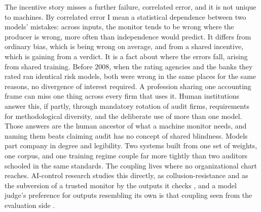 \documentclass[11pt]{article}
\begin{document}
The incentive story misses a further failure, correlated error, and it is not unique to machines. By correlated error I mean a statistical dependence between two models' mistakes: across inputs, the monitor tends to be wrong where the producer is wrong, more often than independence would predict. It differs from ordinary bias, which is being wrong on average, and from a shared incentive, which is gaining from a verdict. It is a fact about where the errors fall, arising from shared training. Before 2008, when the rating agencies and the banks they rated ran identical risk models, both were wrong in the same places for the same reasons, no divergence of interest required. A profession sharing one accounting frame can miss one thing across every firm that uses it. Human institutions answer this, if partly, through mandatory rotation of audit firms, requirements for methodological diversity, and the deliberate use of more than one model. Those answers are the human ancestor of what a machine monitor needs, and naming them beats claiming audit has no concept of shared blindness. Models part company in degree and legibility. Two systems built from one set of weights, one corpus, and one training regime couple far more tightly than two auditors schooled in the same standards. The coupling lives where no organizational chart reaches. AI-control research studies this directly, as collusion-resistance and as the subversion of a trusted monitor by the outputs it checks \citep{greenblatt2023,adaptiveattacks2025}, and a model judge's preference for outputs resembling its own is that coupling seen from the evaluation side \citep{zheng2023}.
\end{document}
